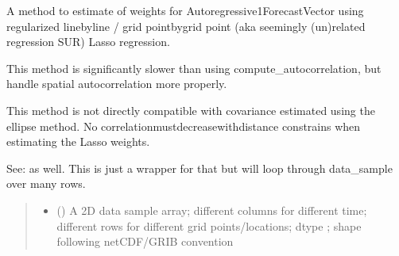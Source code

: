 \documentclass[letterpaper,10pt,english]{sphinxmanual}
\begin{document}
\begin{fulllineitems}
\label{\detokenize{kalman:glomar_gridding.autocorrelation.LassoEstimate_AR1}}
\pysigstartsignatures
\pysiglinewithargsret
{}
{\sphinxparamcomma {}\sphinxparamcomma {}\sphinxparamcomma {}\sphinxparamcomma {}\sphinxparamcomma {}\sphinxparamcomma {}\sphinxparamcomma {}}
{}
\pysigstopsignatures
\sphinxAtStartPar
A method to estimate of weights for Autoregressive1ForecastVector
using regularized line\sphinxhyphen{}by\sphinxhyphen{}line / grid point\sphinxhyphen{}by\sphinxhyphen{}grid point (aka seemingly
(un)related regression SUR) Lasso regression.

\sphinxAtStartPar
This method is significantly slower than using compute\_autocorrelation,
but handle spatial autocorrelation more properly.

\sphinxAtStartPar
This method is not directly compatible with covariance estimated
using the ellipse method. No correlation\sphinxhyphen{}must\sphinxhyphen{}decrease\sphinxhyphen{}with\sphinxhyphen{}distance
constrains when estimating the Lasso weights.

\sphinxAtStartPar
See:
as well. This is just a wrapper for that but will loop through
data\_sample over many rows.
\begin{quote}\begin{description}
\begin{itemize}
\item {}
\sphinxAtStartPar
{} () \textendash{} A 2D data sample array;
different columns for different time;
different rows for different grid points/locations;
dtype ;
shape  following netCDF/GRIB convention


\end{itemize}
\end{description}
\end{quote}
\end{fulllineitems}
\end{document}
